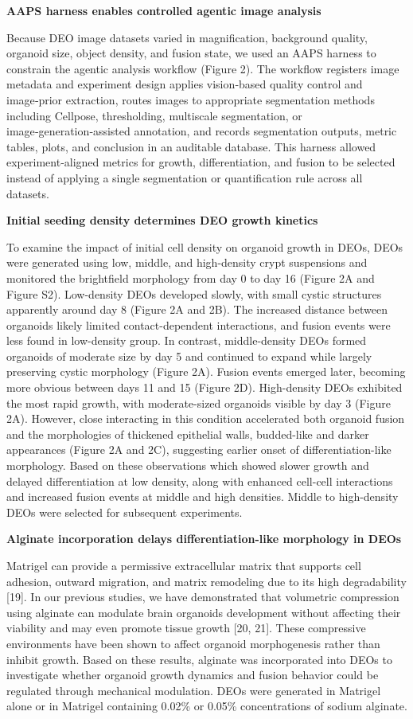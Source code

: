 \documentclass[
]{article}
\begin{document}
\textbf{AAPS harness enables controlled agentic image analysis}

Because DEO image datasets varied in magnification, background quality, organoid size, object density, and fusion state, we used an AAPS harness to constrain the agentic analysis workflow (Figure 2). The workflow registers image metadata and experiment design applies vision‑based quality control and image‑prior extraction, routes images to appropriate segmentation methods including Cellpose, thresholding, multiscale segmentation, or image‑generation‑assisted annotation, and records segmentation outputs, metric tables, plots, and conclusion in an auditable database. This harness allowed experiment‑aligned metrics for growth, differentiation, and fusion to be selected instead of applying a single segmentation or quantification rule across all datasets.

\textbf{Initial seeding density determines DEO growth kinetics}

To examine the impact of initial cell density on organoid growth in DEOs, DEOs were generated using low, middle, and high-density crypt suspensions and monitored the brightfield morphology from day 0 to day 16 (Figure 2A and Figure S2). Low-density DEOs developed slowly, with small cystic structures apparently around day 8 (Figure 2A and 2B). The increased distance between organoids likely limited contact-dependent interactions, and fusion events were less found in low-density group. In contrast, middle-density DEOs formed organoids of moderate size by day 5 and continued to expand while largely preserving cystic morphology (Figure 2A). Fusion events emerged later, becoming more obvious between days 11 and 15 (Figure 2D). High-density DEOs exhibited the most rapid growth, with moderate-sized organoids visible by day 3 (Figure 2A). However, close interacting in this condition accelerated both organoid fusion and the morphologies of thickened epithelial walls, budded-like and darker appearances (Figure 2A and 2C), suggesting earlier onset of differentiation-like morphology. Based on these observations which showed slower growth and delayed differentiation at low density, along with enhanced cell-cell interactions and increased fusion events at middle and high densities. Middle to high-density DEOs were selected for subsequent experiments.

\textbf{Alginate incorporation delays differentiation-like morphology in DEOs}

Matrigel can provide a permissive extracellular matrix that supports cell adhesion, outward migration, and matrix remodeling due to its high degradability {[}19{]}. In our previous studies, we have demonstrated that volumetric compression using alginate can modulate brain organoids development without affecting their viability and may even promote tissue growth {[}20, 21{]}. These compressive environments have been shown to affect organoid morphogenesis rather than inhibit growth. Based on these results, alginate was incorporated into DEOs to investigate whether organoid growth dynamics and fusion behavior could be regulated through mechanical modulation. DEOs were generated in Matrigel alone or in Matrigel containing 0.02\% or 0.05\% concentrations of sodium alginate.
\end{document}
